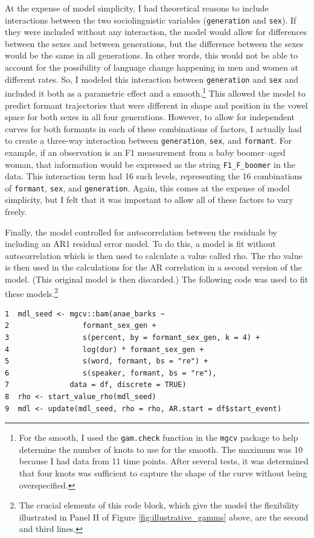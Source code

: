 At the expense of model simplicity, I had theoretical reasons to include interactions between the two sociolinguistic variables (\texttt{generation} and \texttt{sex}). If they were included without any interaction, the model would allow for differences between the sexes and between generations, but the difference between the sexes would be the same in all generations. In other words, this would not be able to account for the possibility of language change happening in men and women at different rates. So, I modeled this interaction between \texttt{generation} and \texttt{sex} and included it both as a parametric effect and a smooth.\footnote{For the smooth, I used the \texttt{gam.check} function in the \texttt{mgcv} package to help determine the number of knots to use for the smooth. The maximum was 10 because I had data from 11 time points. After several tests, it was determined that four knots was sufficient to capture the shape of the curve without being overspecified.} This allowed the model to predict formant trajectories that were different in shape and position in the vowel space for both sexes in all four generations. However, to allow for independent curves for both formants in each of these combinations of factors, I actually had to create a three-way interaction between \texttt{generation}, \texttt{sex}, and \texttt{formant}. For example, if an observation is an F1 measurement from a baby boomer–aged woman, that information would be expressed as the string \texttt{F1\_F\_boomer} in the data. This interaction term had 16 such levels, representing the 16 combinations of \texttt{formant}, \texttt{sex}, and \texttt{generation}. Again, this comes at the expense of model simplicity, but I felt that it was important to allow all of these factors to vary freely.

Finally, the model controlled for autocorrelation between the residuals by including an AR1 residual error model. To do this, a model is fit without autocorrelation which is then used to calculate a value called rho. The rho value is then used in the calculations for the AR correlation in a second version of the model. (This original model is then discarded.) The following code was used to fit these models.\footnote{The crucial elements of this code block, which give the model the flexibility illustrated in Panel H of Figure \ref{fig:illustrative_gamms} above, are the second and third lines.}

\begin{verbatim}
1  mdl_seed <- mgcv::bam(anae_barks ~
2                 formant_sex_gen +
3                 s(percent, by = formant_sex_gen, k = 4) +
4                 log(dur) * formant_sex_gen +
5                 s(word, formant, bs = "re") +
6                 s(speaker, formant, bs = "re"),
7              data = df, discrete = TRUE)
8  rho <- start_value_rho(mdl_seed)
9  mdl <- update(mdl_seed, rho = rho, AR.start = df$start_event)
\end{verbatim}


